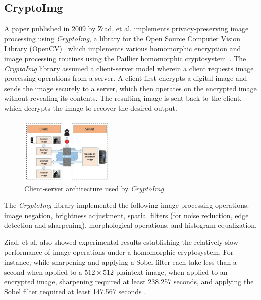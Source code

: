 \subsection{CryptoImg}
A paper published in 2009 by Ziad, et al. implements privacy-preserving image processing using \textit{CryptoImg}, a library for the Open Source Computer Vision Library (OpenCV)~\cite{bradski_opencv_2000} which implements various homomorphic encryption and image processing routines using the Paillier homomorphic cryptosystem~\cite{ziad_cryptoimg:_2016}. The \textit{CryptoImg} library assumed a client-server model wherein a client requests image processing operations from a server. A client first encrypts a digital image and sends the image securely to a server, which then operates on the encrypted image without revealing its contents. The resulting image is sent back to the client, which decrypts the image to recover the desired output.
\begin{figure}[!ht]
    \centering
    \includegraphics[width=0.4\textwidth]{figures/ClientServerModel.png}
    \caption{Client-server architecture used by \textit{CryptoImg} \cite{ziad_cryptoimg:_2016}}
    \label{fig:clientserver}
\end{figure}

The \textit{CryptoImg} library implemented the following image processing operations: image negation, brightness adjustment, spatial filters (for noise reduction, edge detection and sharpening), morphological operations, and histogram equalization.


Ziad, et al. also showed experimental results establishing the relatively slow performance of image operations under a homomorphic cryptosystem. For instance, while sharpening and applying a Sobel filter each take less than a second when applied to a $512\times 512$ plaintext image, when applied to an encrypted image, sharpening required at least 238.257 seconds, and applying the Sobel filter required at least 147.567 seconds \cite{ziad_cryptoimg:_2016}.


